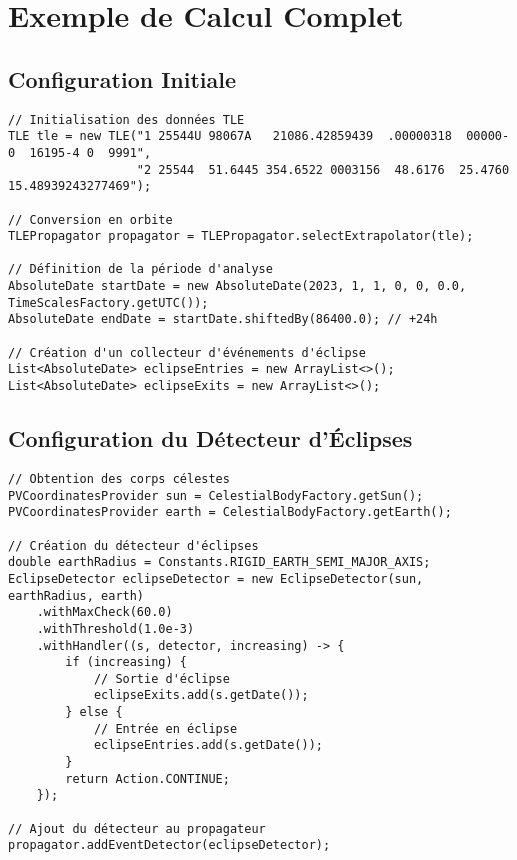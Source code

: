 \documentclass[12pt,a4paper]{article}
\begin{document}
\section{Exemple de Calcul Complet}

\subsection{Configuration Initiale}

\begin{verbatim}
// Initialisation des données TLE
TLE tle = new TLE("1 25544U 98067A   21086.42859439  .00000318  00000-0  16195-4 0  9991",
                  "2 25544  51.6445 354.6522 0003156  48.6176  25.4760 15.48939243277469");

// Conversion en orbite
TLEPropagator propagator = TLEPropagator.selectExtrapolator(tle);

// Définition de la période d'analyse
AbsoluteDate startDate = new AbsoluteDate(2023, 1, 1, 0, 0, 0.0, TimeScalesFactory.getUTC());
AbsoluteDate endDate = startDate.shiftedBy(86400.0); // +24h

// Création d'un collecteur d'événements d'éclipse
List<AbsoluteDate> eclipseEntries = new ArrayList<>();
List<AbsoluteDate> eclipseExits = new ArrayList<>();
\end{verbatim}

\subsection{Configuration du Détecteur d'Éclipses}

\begin{verbatim}
// Obtention des corps célestes
PVCoordinatesProvider sun = CelestialBodyFactory.getSun();
PVCoordinatesProvider earth = CelestialBodyFactory.getEarth();

// Création du détecteur d'éclipses
double earthRadius = Constants.RIGID_EARTH_SEMI_MAJOR_AXIS;
EclipseDetector eclipseDetector = new EclipseDetector(sun, earthRadius, earth)
    .withMaxCheck(60.0)
    .withThreshold(1.0e-3)
    .withHandler((s, detector, increasing) -> {
        if (increasing) {
            // Sortie d'éclipse
            eclipseExits.add(s.getDate());
        } else {
            // Entrée en éclipse
            eclipseEntries.add(s.getDate());
        }
        return Action.CONTINUE;
    });

// Ajout du détecteur au propagateur
propagator.addEventDetector(eclipseDetector);
\end{verbatim}
\end{document}
